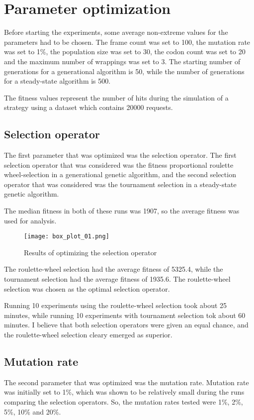 \section{Parameter optimization}
Before starting the experiments, some average non-extreme values for the parameters had to be chosen. The frame count was set to 100, the mutation rate was set to 1\%, the population size was set to 30, the codon count was set to 20 and the maximum number of wrappings was set to 3. The starting number of generations for a generational algorithm is 50, while the number of generations for a steady-state algorithm is 500.

The fitness values represent the number of hits during the simulation of a strategy using a dataset which contains 20000 requests.

\subsection{Selection operator}
The first parameter that was optimized was the selection operator. The first selection operator that was considered was the fitness proportional roulette wheel-selection in a generational genetic algorithm, and the second selection operator that was considered was the tournament selection in a steady-state genetic algorithm.

The median fitness in both of these runs was 1907, so the average fitness was used for analysis.

\begin{figure}[H]
	\centering
	\texttt{[image: box\_plot\_01.png]}
	\caption{Results of optimizing the selection operator}
\end{figure}

The roulette-wheel selection had the average fitness of 5325.4, while the tournament selection had the average fitness of 1935.6. The roulette-wheel selection was chosen as the optimal selection operator.

Running 10 experiments using the roulette-wheel selection took about 25 minutes, while running 10 experiments with tournament selection tok about 60 minutes. I believe that both selection operators were given an equal chance, and the roulette-wheel selection cleary emerged as superior.

\subsection{Mutation rate}
The second parameter that was optimized was the mutation rate. Mutation rate was initially set to 1\%, which was shown to be relatively small during the runs comparing the selection operators. So, the mutation rates tested were 1\%, 2\%, 5\%, 10\% and 20\%.


